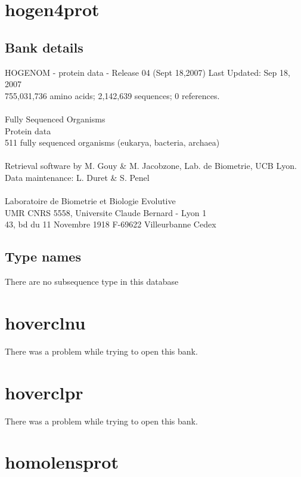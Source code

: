\documentclass{article}
\begin{document}
\begin{Schunk}
\section{ hogen4prot }
\subsection{Bank details}
HOGENOM - protein data - Release 04 (Sept 18,2007) Last Updated: Sep 18, 2007\\
755,031,736 amino acids; 2,142,639 sequences; 0 references.\\
\\
Fully Sequenced Organisms\\
Protein data\\
511 fully sequenced organisms (eukarya, bacteria, archaea)\\
\\
Retrieval software by M. Gouy \& M. Jacobzone, Lab. de Biometrie, UCB Lyon.\\
Data maintenance: L. Duret \& S. Penel\\
\\
Laboratoire de Biometrie et Biologie Evolutive\\
UMR CNRS 5558, Universite Claude Bernard - Lyon 1\\
43, bd du 11 Novembre 1918 F-69622 Villeurbanne Cedex\\


\subsection{Type names}
There are no subsequence type in this database
\section{ hoverclnu }
There was a problem while trying to open this bank.
\section{ hoverclpr }
There was a problem while trying to open this bank.
\section{ homolensprot }

\end{Schunk}
\end{document}
